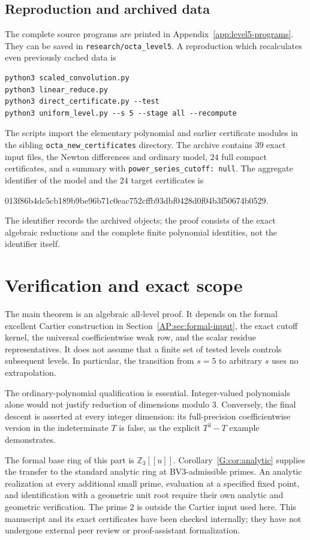 \documentclass[11pt,a4paper]{article}
\theoremstyle{definition}\newtheorem{definition}[theorem]{Definition}
\theoremstyle{remark}\newtheorem{remark}[theorem]{Remark}
\numberwithin{equation}{section}
\begin{document}
\subsection{Reproduction and archived data}
The complete source programs are printed in Appendix~\ref{app:level5-programs}.
They can be saved in \texttt{research/octa\_level5}.  A reproduction
which recalculates even previously cached data is
\begin{verbatim}
python3 scaled_convolution.py
python3 linear_reduce.py
python3 direct_certificate.py --test
python3 uniform_level.py --s 5 --stage all --recompute
\end{verbatim}
The scripts import the elementary polynomial and earlier certificate
modules in the sibling \texttt{octa\_new\_certificates} directory.
The archive contains $39$ exact input files, the Newton differences
and ordinary model, $24$ full compact certificates, and a summary
with \texttt{power\_series\_cutoff: null}.  The aggregate identifier
of the model and the $24$ target certificates is
\begin{center}\ttfamily\small
013f86b4dc5cb189b9be96b71c0eac752cffb93dbf0428d0f04b3f50674b0529.
\end{center}
The identifier records the archived objects; the proof consists of
the exact algebraic reductions and the complete finite polynomial
identities, not the identifier itself.

\clearpage
\section{Verification and exact scope}\label{AP:source-main-8}\label{AP:sec:scope-end}
The main theorem is an algebraic all-level proof.  It depends on the
formal excellent Cartier construction in Section~\ref{AP:sec:formal-input},
the exact cutoff kernel, the universal coefficientwise weak row, and
the scalar residue representatives.  It does not assume that a finite
set of tested levels controls subsequent levels.  In particular, the
transition from $s=5$ to arbitrary $s$ uses no extrapolation.

The ordinary-polynomial qualification is essential.  Integer-valued
polynomials alone would not justify reduction of dimensions modulo $3$.
Conversely, the final descent is asserted at every integer dimension:
its full-precision coefficientwise version in the indeterminate $T$
is false, as the explicit $T^3-T$ example demonstrates.

The formal base ring of this part is $\mathbb Z_3[[u]]$.
Corollary~\ref{G:cor:analytic} supplies the transfer to the standard
analytic ring at BV3-admissible primes. An analytic realization at
every additional small prime, evaluation at a specified fixed point,
and identification with a geometric unit root require their own
analytic and geometric verification.  The prime $2$ is outside the
Cartier input used here.  This manuscript and its exact certificates
have been checked internally; they have not undergone external peer
review or proof-assistant formalization.
\end{document}
